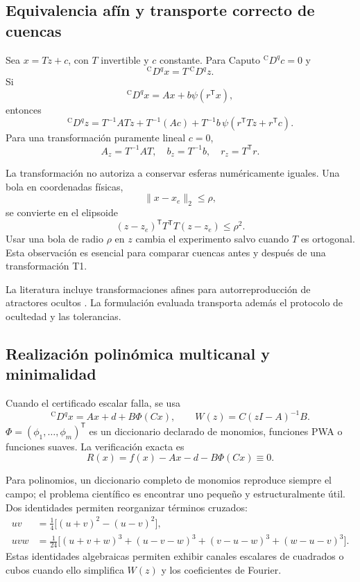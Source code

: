 \subsection{Equivalencia afín y transporte correcto de cuencas}
\label{sec:affine-caputo}

Sea \(x=Tz+c\), con \(T\) invertible y \(c\) constante. Para Caputo
\({}^{\mathrm C}D^q c=0\) y
\[
 {}^{\mathrm C}D^q x=T\,{}^{\mathrm C}D^q z.
\]
Si
\[
 {}^{\mathrm C}D^q x=Ax+b\psi(r^{\mathsf T}x),
\]
entonces
\begin{equation}
 {}^{\mathrm C}D^q z
 =T^{-1}ATz+T^{-1}(Ac)
 +T^{-1}b\,
 \psi\!\left(r^{\mathsf T}Tz+r^{\mathsf T}c\right).
 \label{eq:th-affine-caputo}
\end{equation}
Para una transformación puramente lineal \(c=0\),
\[
 A_z=T^{-1}AT,\quad b_z=T^{-1}b,\quad r_z=T^{\mathsf T}r.
\]

La transformación no autoriza a conservar esferas numéricamente iguales. Una
bola en coordenadas físicas,
\[
 \|x-x_e\|_2\leq\rho,
\]
se convierte en el elipsoide
\begin{equation}
 (z-z_e)^{\mathsf T}T^{\mathsf T}T(z-z_e)\leq\rho^2.
 \label{eq:th-ellipsoid}
\end{equation}
Usar una bola de radio \(\rho\) en \(z\) cambia el experimento salvo cuando
\(T\) es ortogonal. Esta observación es esencial para comparar cuencas antes y
después de una transformación T1.

\begin{remark}
La literatura incluye transformaciones afines para autorreproducción de
atractores ocultos \cite{sayed2020}. La formulación evaluada transporta además
el protocolo de ocultedad y las tolerancias.
\end{remark}

\subsection{Realización polinómica multicanal y minimalidad}
\label{sec:mimo-dictionary}

Cuando el certificado escalar falla, se usa
\begin{equation}
 {}^{\mathrm C}D^q x=Ax+d+B\Phi(Cx),
 \qquad
 W(z)=C(zI-A)^{-1}B.
 \label{eq:th-mimo}
\end{equation}
\(\Phi=(\phi_1,\ldots,\phi_m)^{\mathsf T}\) es un diccionario declarado de
monomios, funciones PWA o funciones suaves. La verificación exacta es
\[
 R(x)=f(x)-Ax-d-B\Phi(Cx)\equiv0.
\]

Para polinomios, un diccionario completo de monomios reproduce siempre el
campo; el problema científico es encontrar uno pequeño y estructuralmente
útil. Dos identidades permiten reorganizar términos cruzados:
\begin{align}
 uv&=\frac14\bigl[(u+v)^2-(u-v)^2\bigr],
 \label{eq:th-square-polarization}\\
 uvw&=\frac1{24}\bigl[(u+v+w)^3+(u-v-w)^3
 +(v-u-w)^3+(w-u-v)^3\bigr].
 \label{eq:th-cubic-polarization}
\end{align}
Estas identidades algebraicas permiten exhibir canales escalares de cuadrados
o cubos cuando ello simplifica
\(W(z)\) y los coeficientes de Fourier.

